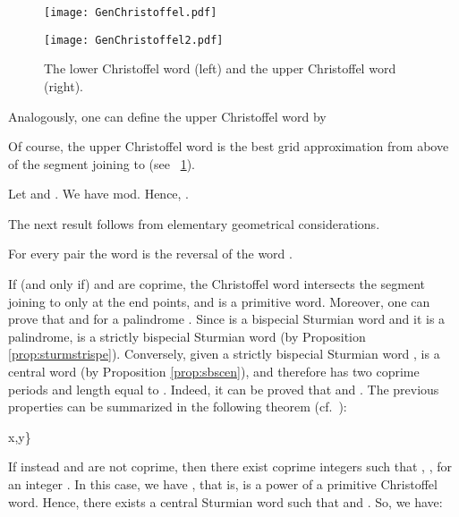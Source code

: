 \documentclass{llncs}
\begin{document}
\begin{figure}
\begin{center}
\begin{minipage}{5.7cm}
\texttt{[image: GenChristoffel.pdf]}
\end{minipage}
\begin{minipage}{5.7cm}
\texttt{[image: GenChristoffel2.pdf]}
\end{minipage}
\end{center}
\caption{The lower Christoffel word  (left) and the upper Christoffel word  (right).\label{fig:GC}}
\end{figure}

Analogously, one can define the upper Christoffel word  by

Of course, the upper Christoffel word  is the best grid approximation from above of the segment joining  to  (see \figurename~\ref{fig:GC}).

\begin{example}
 Let  and . We have  mod. Hence, .
\end{example}

The next result follows from elementary geometrical considerations.

\begin{lemma}\label{lem:rev}
 For every pair  the word  is the reversal of the word .
\end{lemma}

If (and only if)  and  are coprime, the Christoffel word  intersects the segment joining  to  only at the end points, and is a primitive word. Moreover, one can prove that  and  for a palindrome . Since  is a bispecial Sturmian word and it is a palindrome,   is a strictly bispecial Sturmian word (by Proposition \ref{prop:sturmstrispe}). Conversely, given a strictly bispecial Sturmian word ,  is a central word (by Proposition \ref{prop:sbscen}), and therefore has two coprime periods  and length equal to . Indeed, it can be proved that  and . The previous properties can be summarized in the following theorem (cf.~\cite{BeDel97}):

\begin{theorem}\label{theor:sbsCP}
  x,y\in \Sigma\}
\end{theorem}

If instead  and  are not coprime, then there exist coprime integers  such that , , for an integer . In this case, we have , that is,  is a power of a primitive Christoffel word. Hence, there exists a central Sturmian word  such that  and . So, we have:
\end{document}
